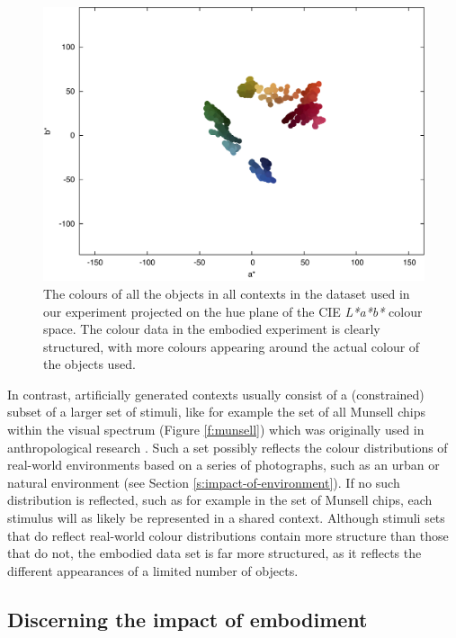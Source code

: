 \begin{figure}[htbp]
\begin{center}
\includegraphics[width=.8\textwidth]{./experiments/figures/grounding-grounded-world.pdf}
\caption[Structure of the grounded data set]{The colours of all the
  objects in all contexts in the dataset used in our experiment
  projected on the hue plane of the CIE \emph{L*a*b*} colour
  space. The colour data in the embodied experiment is clearly
  structured, with more colours appearing around the actual colour of
  the objects used.}
\label{fig:grounded-world}
\end{center}
\end{figure}

In contrast, artificially generated contexts usually consist of a
(constrained) subset of a larger set of stimuli, like for example the
set of all Munsell chips within the visual spectrum (Figure
\ref{f:munsell}) which was originally used in anthropological research
\citep{kay10world, maclaury97color}. Such a set possibly reflects the
colour distributions of real-world environments based on a series of
photographs, such as an urban or natural environment (see Section
\ref{s:impact-of-environment}). If no such distribution is reflected,
such as for example in the set of Munsell chips, each stimulus will as
likely be represented in a shared context. Although stimuli sets that
do reflect real-world colour distributions contain more structure than
those that do not, the embodied data set is far more structured, as it
reflects the different appearances of a limited number of objects.

\subsection{Discerning the impact of embodiment}

